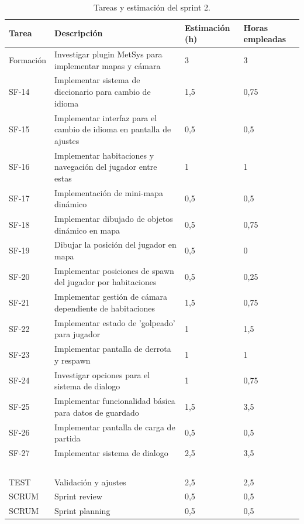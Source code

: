 \begin{table}[!ht]
    \centering
    \begin{tabular}{|l|p{8cm}|p{2cm}|p{2cm}|}
    \hline
        Tarea & Descripción & Estimación (h) & Horas empleadas \\ \hline
        Formación & Investigar plugin MetSys para implementar mapas y cámara & 3 & 3 \\ \hline
        SF-14 & Implementar sistema de diccionario para cambio de idioma & 1,5 & 0,75 \\ \hline
        SF-15 & Implementar interfaz para el cambio de idioma en pantalla de ajustes & 0,5 & 0,5 \\ \hline
        SF-16 & Implementar habitaciones y navegación del jugador entre estas & 1 & 1 \\ \hline
        SF-17 & Implementación de mini-mapa dinámico & 0,5 & 0,5 \\ \hline
        SF-18 & Implementar dibujado de objetos dinámico en mapa & 0,5 & 0,75 \\ \hline
        SF-19 & Dibujar la posición del jugador en mapa & 0,5 & 0 \\ \hline
        SF-20 & Implementar posiciones de spawn del jugador por habitaciones & 0,5 & 0,25 \\ \hline
        SF-21 & Implementar gestión de cámara dependiente de habitaciones & 1,5 & 0,75 \\ \hline
        SF-22 & Implementar estado de 'golpeado' para jugador & 1 & 1,5 \\ \hline
        SF-23 & Implementar pantalla de derrota y respawn & 1 & 1 \\ \hline
        SF-24 & Investigar opciones para el sistema de dialogo & 1 & 0,75 \\ \hline
        SF-25 & Implementar funcionalidad básica para datos de guardado & 1,5 & 3,5 \\ \hline
        SF-26 & Implementar pantalla de carga de partida & 0,5 & 0,5 \\ \hline
        SF-27 & Implementar sistema de dialogo & 2,5 & 3,5 \\ \hline
        ~ & ~ & ~ & ~ \\ \hline
        TEST & Validación y ajustes & 2,5 & 2,5 \\ \hline
        SCRUM & Sprint review & 0,5 & 0,5 \\ \hline
        SCRUM & Sprint planning & 0,5 & 0,5 \\ \hline
    \end{tabular}
    \caption{Tareas y estimación del sprint 2.}
    \label{tab:sprint2task}
\end{table}

